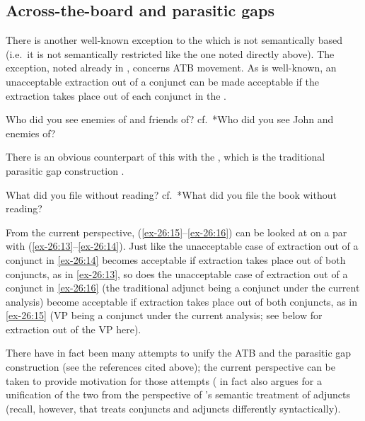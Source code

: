 \documentclass[output=paper]{langsci/langscibook}
\begin{document}
\subsection{Across-the-board  and parasitic gaps}\label{sub:35.3.2}

There is another well-known exception to the  which is not
semantically based (i.e.\ it is not semantically restricted like the one noted
directly above). The exception, noted already in \citet{Ross1967}, concerns
\gls{ATB} movement. As is well-known, an
unacceptable extraction out of a conjunct can be made acceptable if the
extraction takes place out of each conjunct in the
.

\ea\label{ex-26:13} Who did you see enemies of and friends of?
\ex\label{ex-26:14} cf.\ *Who did you see John and enemies of?
\z

There is an obvious counterpart of this with the , which is the traditional
parasitic gap construction \parencite[see
also][]{Haik1985,HuyvanRiem1985,Williams1990,Franks1993,Progovac1998,Nunes2004}.

\ea\label{ex-26:15} What did you file without reading?
\ex\label{ex-26:16} cf.\ *What did you file the book without reading?
\z

From the current perspective, (\ref{ex-26:15}--\ref{ex-26:16}) can be looked at on a par with
(\ref{ex-26:13}--\ref{ex-26:14}). Just like the unacceptable case of extraction out of a conjunct in
\eqref{ex-26:14} becomes acceptable if extraction takes place out of both conjuncts, as in
\eqref{ex-26:13}, so does the unacceptable case of extraction out of a conjunct in \eqref{ex-26:16}
(the traditional adjunct being a conjunct under the current analysis) become
acceptable if extraction takes place out of both conjuncts, as in \eqref{ex-26:15} (VP
being a conjunct under the current analysis; see below for extraction out of
the VP here).

There have in fact been many attempts to unify the
\gls{ATB} and the parasitic
gap construction (see the references cited above); the current perspective can
be taken to provide motivation for those attempts (\citealt{Takahashi1994} in
fact also argues for a unification of the two from the perspective of
\citeauthor{Higginbotham1985}’s semantic treatment of adjuncts
(recall, however, that \citeauthor{Takahashi1994} treats conjuncts and adjuncts
differently syntactically).
\end{document}
